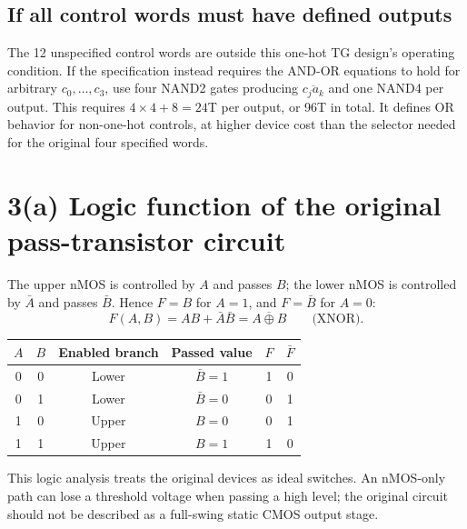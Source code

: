 \documentclass[11pt,a4paper]{article}
\begin{document}
\subsection*{If all control words must have defined outputs}
The 12 unspecified control words are outside this one-hot TG design's operating
condition. If the specification instead requires the AND-OR equations to hold for
arbitrary $c_0,\ldots,c_3$, use four NAND2 gates producing $\overline{c_j a_k}$
and one NAND4 per output. This requires $4\times4+8=24$T per output, or 96T in
total. It defines OR behavior for non-one-hot controls, at higher device cost
than the selector needed for the original four specified words.

\newpage
\section*{3(a) Logic function of the original pass-transistor circuit}
The upper nMOS is controlled by $A$ and passes $B$; the lower nMOS is controlled
by $\bar A$ and passes $\bar B$. Hence $F=B$ for $A=1$, and $F=\bar B$ for $A=0$:
\[
 \boxed{F(A,B)=AB+\bar A\bar B=\overline{A\oplus B}}\qquad\text{(XNOR)}.
\]
\begin{center}
\begin{tabular}{cccccc}\toprule
$A$&$B$&Enabled branch&Passed value&$F$&$\bar F$\\\midrule
0&0&Lower&$\bar B=1$&1&0\\0&1&Lower&$\bar B=0$&0&1\\
1&0&Upper&$B=0$&0&1\\1&1&Upper&$B=1$&1&0\\\bottomrule
\end{tabular}
\end{center}
This logic analysis treats the original devices as ideal switches. An nMOS-only
path can lose a threshold voltage when passing a high level; the original circuit
should not be described as a full-swing static CMOS output stage.
\end{document}

